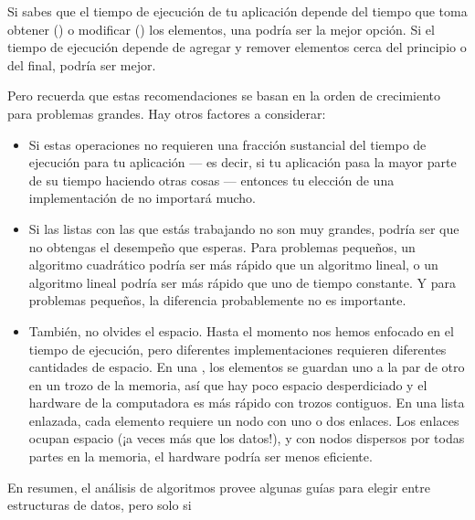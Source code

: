\documentclass[12pt]{book}
\theoremstyle{exercise}
\begin{document}

Si sabes que el tiempo de ejecución de tu aplicación depende del tiempo
que toma obtener () o modificar () los elementos,
una  podría ser la mejor opción. Si el tiempo de ejecución depende de
agregar y remover elementos cerca del principio o del final, 
podría ser mejor.


Pero recuerda que estas recomendaciones se basan en la orden de crecimiento
para problemas grandes. Hay otros factores a considerar:

\begin{itemize}

\item
  Si estas operaciones no requieren una fracción sustancial del tiempo
  de ejecución para tu aplicación --- es decir, si tu aplicación pasa la
  mayor parte de su tiempo haciendo otras cosas --- entonces tu elección
  de una implementación de  no importará mucho.

\item
  Si las listas con las que estás trabajando no son muy grandes, podría ser
  que no obtengas el desempeño que esperas. Para problemas pequeños, un
  algoritmo cuadrático podría ser más rápido que un algoritmo lineal, o un algoritmo
  lineal podría ser más rápido que uno de tiempo constante. Y para problemas
  pequeños, la diferencia probablemente no es importante.

\item
  También, no olvides el espacio. Hasta el momento nos hemos enfocado en el
  tiempo de ejecución, pero diferentes implementaciones requieren diferentes
  cantidades de espacio. En una , los elementos se guardan uno a
  la par de otro en un trozo de la memoria, así que hay poco espacio
  desperdiciado y el hardware de la computadora es más rápido con trozos
  contiguos. En una lista enlazada, cada elemento requiere un nodo con uno o dos
  enlaces. Los enlaces ocupan espacio (¡a veces más que los datos!), y con nodos
  dispersos por todas partes en la memoria, el hardware podría ser menos eficiente.

\end{itemize}

En resumen, el análisis de algoritmos provee algunas guías para elegir entre
estructuras de datos, pero solo si
\end{document}
